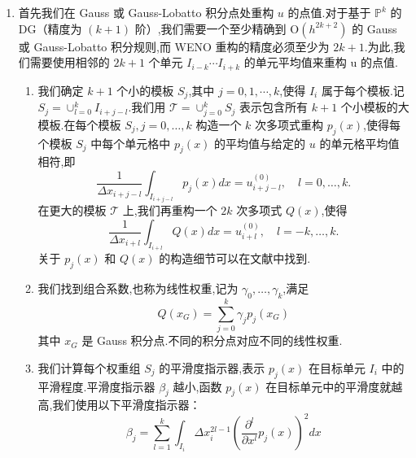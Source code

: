 \documentclass{book}
\begin{document}
\begin{enumerate}[label={{\bf Step \arabic*}:}]
    \item 首先我们在 Gauss 或 Gauss-Lobatto 积分点处重构 $u$ 的点值.对于基于 $\mathbb{P}^{k}$ 的 DG（精度为 $(k+1)$ 阶）,我们需要一个至少精确到 $\mathrm{O}\left(h^{2 k+2}\right)$ 的 Gauss 或 Gauss-Lobatto 积分规则,而 WENO 重构的精度必须至少为 $2 k+1$.为此,我们需要使用相邻的 $2 k+1$ 个单元 $I_{i-k}\cdots I_{i+k}$ 的单元平均值来重构 u 的点值.
          \begin{enumerate}[label={\bf Step 1.\arabic*.}]
              \item 我们确定 $k+1$ 个小的模板 $S_{j}$,其中 $j=0,1,\cdots,k$,使得 $I_{i}$ 属于每个模板.记 $S_{j}=\cup_{l=0}^{k} I_{i+j-l}$.我们用 $\mathcal{T}=\cup_{j=0}^{k} S_{j}$ 表示包含所有 $k+1$ 个小模板的大模板.在每个模板 $S_j, j=0,\ldots,k$ 构造一个 $k$ 次多项式重构 $p_j(x)$,使得每个模板 $S_j$ 中每个单元格中 $p_j(x)$ 的平均值与给定的 $u$ 的单元格平均值相符,即\begin{equation}
                        \frac{1}{\Delta x_{i+j-l}} \int_{I_{i+j-l}} p_{j}(x) dx =u_{i+j-l}^{(0)},\quad l=0,\ldots,k.
                    \end{equation}
                    在更大的模板 $\mathcal{T}$ 上,我们再重构一个 $2k$ 次多项式 $Q(x)$,使得
                    \begin{equation}
                        \frac{1}{\Delta x_{i+l}} \int_{I_{i+l}} Q(x) dx=u_{i+l}^{(0)},\quad l=-k,\ldots,k.
                    \end{equation}
                    关于 $p_j(x)$ 和 $Q(x)$ 的构造细节可以在文献\cite{WENO5}中找到.
              \item 我们找到组合系数,也称为线性权重,记为 $\gamma_{0},\ldots,\gamma_{k}$,满足
                    \begin{equation}
                        Q(x_G)=\sum_{j=0}^k\gamma_j p_j(x_G)
                    \end{equation}
                    其中 $x_G$ 是 Gauss 积分点.不同的积分点对应不同的线性权重.
              \item 我们计算每个权重组 $S_j$ 的平滑度指示器,表示 $p_j(x)$ 在目标单元 $I_i$ 中的平滑程度.平滑度指示器 $\beta_j$ 越小,函数 $p_j(x)$ 在目标单元中的平滑度就越高,我们使用以下平滑度指示器：
                    \begin{equation}
                        \beta_{j}=\sum_{l=1}^{k} \int_{I_{i}} \Delta x_{i}^{2 l-1}\left(\frac{\partial^{l}}{\partial x^{l}} p_{j}(x)\right)^{2} d x
                    \end{equation}

\end{enumerate}
\end{enumerate}
\end{document}
